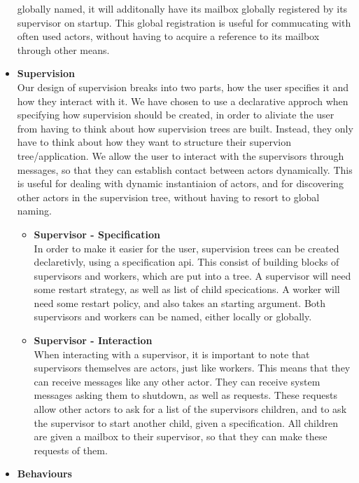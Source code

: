 \documentclass[a4paper]{article}
\begin{document}
\begin{itemize}
  globally named, it will additonally have its mailbox globally registered by
  its supervisor on startup. This global registration is useful for commucating
  with often used actors, without having to acquire a reference to its mailbox
  through other means. 
\item \textbf{Supervision}\\
  Our design of supervision breaks into two parts, how the user specifies it and
  how they interact with it. We have chosen to use a declarative approch when
  specifying how supervision should be created, in order to aliviate the user
  from having to think about how supervision trees are built. Instead, they only
  have to think about how they want to structure their supervion
  tree/application. We allow the user to interact with the supervisors through
  messages, so that they can establish contact between actors dynamically. This
  is useful for dealing with dynamic instantiaion of actors, and for discovering
  other actors in the supervision tree, without having to resort to global
  naming.
  \begin{itemize}
  \item \textbf{Supervisor - Specification}\\
    In order to make it easier for the user, supervision trees can be created
    declaretivly, using a specification api. This consist of building blocks of
    supervisors and workers, which are put into a tree.
    A supervisor will need some restart strategy, as well as list of child
    specications. A worker will need some restart policy, and also takes an
    starting argument. Both supervisors and workers can be named, either locally
    or globally.
  \item \textbf{Supervisor - Interaction}\\
    When interacting with a supervisor, it is important to note that supervisors
    themselves are actors, just like workers. This means that they can receive
    messages like any other actor. They can receive system messages asking them to
    shutdown, as well as requests. These requests allow other actors to ask for a
    list of the supervisors children, and to ask the supervisor to start another
    child, given a specification. All children are given a mailbox to their
    supervisor, so that they can make these requests of them.
  \end{itemize}
\item \textbf{Behaviours}\\

\end{itemize}
\end{document}
